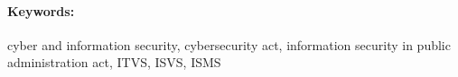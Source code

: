 \documentclass[12pt, twoside]{book}
\begin{document}
\paragraph*{Keywords:} 
cyber and information security,
cybersecurity act,
information security in public administration act,
ITVS,
ISVS,
ISMS




\cleardoublepage
\tableofcontents



\newpage 

\listoffigures
\newpage
\printglossary[type=\acronymtype, title={Zoznam skratiek}, nonumberlist]


\mainmatter
\pagestyle{headings}













\newpage	

\backmatter

\thispagestyle{empty}
\clearpage


 



%
\end{document}
